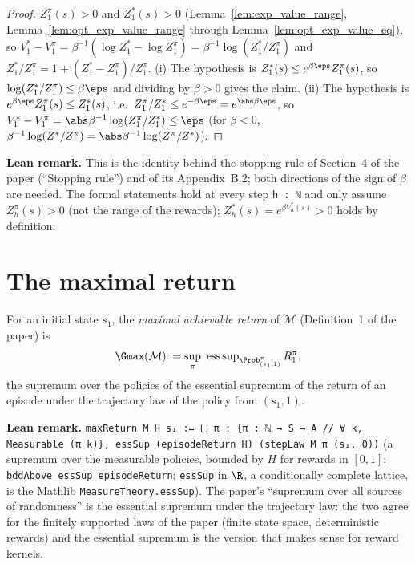 \begin{proof}
\leanok
$Z^\pi_1(s) > 0$ and $Z^*_1(s) > 0$ (Lemma~\ref{lem:exp_value_range},
Lemma~\ref{lem:opt_exp_value_range} through Lemma~\ref{lem:opt_exp_value_eq}), so
$V^*_1 - V^\pi_1 = \beta^{-1}(\log Z^*_1 - \log Z^\pi_1) = \beta^{-1}\log(Z^*_1/Z^\pi_1)$ and
$Z^*_1/Z^\pi_1 = 1 + (Z^*_1 - Z^\pi_1)/Z^\pi_1$. (i) The hypothesis is $Z^*_1(s) \le e^{\beta\eps} Z^\pi_1(s)$,
so $\log(Z^*_1/Z^\pi_1) \le \beta\eps$ and dividing by $\beta > 0$ gives the claim. (ii) The
hypothesis is $e^{\beta\eps} Z^\pi_1(s) \le Z^*_1(s)$, i.e.\ $Z^\pi_1/Z^*_1 \le e^{-\beta\eps} = e^{\abs\beta\eps}$,
so $V^*_1 - V^\pi_1 = \abs\beta^{-1}\log(Z^\pi_1/Z^*_1) \le \eps$ (for $\beta < 0$,
$\beta^{-1}\log(Z^*/Z^\pi) = \abs\beta^{-1}\log(Z^\pi/Z^*)$).
\end{proof}

\textbf{Lean remark.} This is the identity behind the stopping rule of Section~4 of the
paper (``Stopping rule'') and of its Appendix~B.2; both directions of the sign of $\beta$ are
needed. The formal statements hold at every step \texttt{h : ℕ} and only assume
$Z^\pi_h(s) > 0$ (not the range of the rewards); $Z^*_h(s) = e^{\beta V^*_h(s)} > 0$ holds by
definition.

\section{The maximal return}
\label{sec:mdp_gmax}

\begin{definition}\label{def:gmax}
\leanok
{}
For an initial state $s_1$, the \emph{maximal achievable return} of $\mathcal M$ (Definition~1 of
the paper) is
\[
  \Gmax(\mathcal M) := \sup_{\pi}\ \operatorname{ess\,sup}_{\Prob^\pi_{(s_1, 1)}} R^\pi_1 ,
\]
the supremum over the policies of the essential supremum of the return of an episode under the
trajectory law of the policy from $(s_1, 1)$.
\end{definition}

\textbf{Lean remark.} \texttt{maxReturn M H s₁ := ⨆ π : \{π : ℕ → S → A // ∀ k, Measurable (π k)\}, essSup (episodeReturn H) (stepLaw M π (s₁, 0))}
(a supremum over the measurable policies, bounded by $H$ for rewards in $[0, 1]$:
\texttt{bddAbove\_essSup\_episodeReturn}; \texttt{essSup} in $\R$, a conditionally complete
lattice, is the Mathlib \texttt{MeasureTheory.essSup}). The paper's ``supremum over all sources of
randomness'' is the essential supremum under the trajectory law: the two agree for the
finitely supported laws of the paper (finite state space, deterministic rewards) and the
essential supremum is the version that makes sense for reward kernels.

